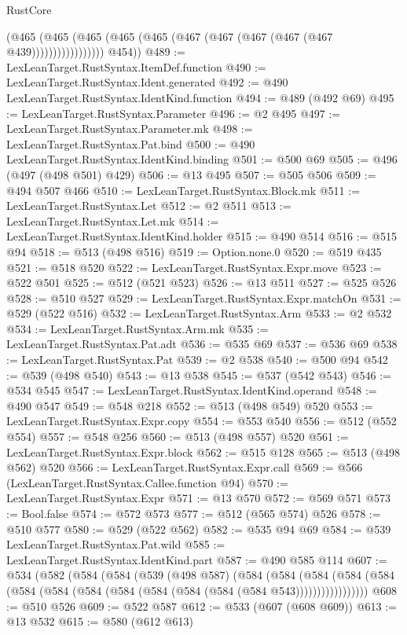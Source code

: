 \begin{lexlean}{RustCore}
\begin{coremodule}
                      (@465
                        (@465 (@465 (@465 (@465 (@467 (@467 (@467 (@467 (@467 @439)))))))))))))))))
        @454))
@489 := LexLeanTarget.RustSyntax.ItemDef.function
@490 := LexLeanTarget.RustSyntax.Ident.generated
@492 := @490 LexLeanTarget.RustSyntax.IdentKind.function
@494 := @489 (@492 @69)
@495 := LexLeanTarget.RustSyntax.Parameter
@496 := @2 @495
@497 := LexLeanTarget.RustSyntax.Parameter.mk
@498 := LexLeanTarget.RustSyntax.Pat.bind
@500 := @490 LexLeanTarget.RustSyntax.IdentKind.binding
@501 := @500 @69
@505 := @496 (@497 (@498 @501) @429)
@506 := @13 @495
@507 := @505 @506
@509 := @494 @507 @466
@510 := LexLeanTarget.RustSyntax.Block.mk
@511 := LexLeanTarget.RustSyntax.Let
@512 := @2 @511
@513 := LexLeanTarget.RustSyntax.Let.mk
@514 := LexLeanTarget.RustSyntax.IdentKind.holder
@515 := @490 @514
@516 := @515 @94
@518 := @513 (@498 @516)
@519 := Option.none.{0}
@520 := @519 @435
@521 := @518 @520
@522 := LexLeanTarget.RustSyntax.Expr.move
@523 := @522 @501
@525 := @512 (@521 @523)
@526 := @13 @511
@527 := @525 @526
@528 := @510 @527
@529 := LexLeanTarget.RustSyntax.Expr.matchOn
@531 := @529 (@522 @516)
@532 := LexLeanTarget.RustSyntax.Arm
@533 := @2 @532
@534 := LexLeanTarget.RustSyntax.Arm.mk
@535 := LexLeanTarget.RustSyntax.Pat.adt
@536 := @535 @69
@537 := @536 @69
@538 := LexLeanTarget.RustSyntax.Pat
@539 := @2 @538
@540 := @500 @94
@542 := @539 (@498 @540)
@543 := @13 @538
@545 := @537 (@542 @543)
@546 := @534 @545
@547 := LexLeanTarget.RustSyntax.IdentKind.operand
@548 := @490 @547
@549 := @548 @218
@552 := @513 (@498 @549) @520
@553 := LexLeanTarget.RustSyntax.Expr.copy
@554 := @553 @540
@556 := @512 (@552 @554)
@557 := @548 @256
@560 := @513 (@498 @557) @520
@561 := LexLeanTarget.RustSyntax.Expr.block
@562 := @515 @128
@565 := @513 (@498 @562) @520
@566 := LexLeanTarget.RustSyntax.Expr.call
@569 := @566 (LexLeanTarget.RustSyntax.Callee.function @94)
@570 := LexLeanTarget.RustSyntax.Expr
@571 := @13 @570
@572 := @569 @571
@573 := Bool.false
@574 := @572 @573
@577 := @512 (@565 @574) @526
@578 := @510 @577
@580 := @529 (@522 @562)
@582 := @535 @94 @69
@584 := @539 LexLeanTarget.RustSyntax.Pat.wild
@585 := LexLeanTarget.RustSyntax.IdentKind.part
@587 := @490 @585 @114
@607 := @534
    (@582
      (@584
        (@584
          (@539
            (@498 @587)
            (@584
              (@584
                (@584
                  (@584 (@584 (@584 (@584 (@584 (@584 (@584 (@584 (@584 (@584 @543)))))))))))))))))
@608 := @510 @526
@609 := @522 @587
@612 := @533 (@607 (@608 @609))
@613 := @13 @532
@615 := @580 (@612 @613)

\end{coremodule}
\end{lexlean}
